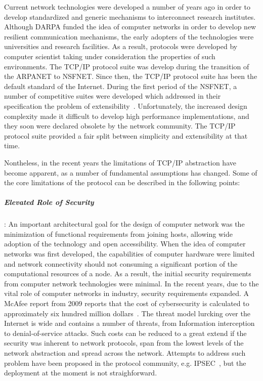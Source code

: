 Current network technologies were developed a number of years ago in order to
develop standardized and generic mechanisms to interconnect
research institutes. Although DARPA funded the idea of computer networks in
order to develop new resilient communication mechanisms, the early adopters of
the technologies were universities and research facilities. As a result,
protocols were developed by computer scientist taking under consideration the
properties of such environments. The TCP/IP protocol suite was develop during
the transition of the ARPANET to NSFNET. Since then, the TCP/IP protocol suite
has been the default standard of the Internet.  During the first period of the
NSFNET, a number of competitive suites were developed which addressed in their
specification the problem of extensibility~.  Unfortunately, the increased design complexity made it
difficult to develop high performance implementations, and they soon
were declared obsolete by the network community. The TCP/IP protocol suite provided a fair
split between simplicity and extensibility at that time.

Nontheless, in the recent years the limitations of TCP/IP abstraction have
become apparent, as a number of fundamental assumptions has changed. Some of the
core limitations of the protocol can be described in the following points:

\subparagraph*{Elevated Role of Security}: 
An important architectural goal for the design of computer network was the
minimization of functional requirements from joining hosts, allowing wide
adoption of the technology and open accessibility.  When the idea of computer
networks was first developed, the capabilities of computer hardware were limited
and network connectivity should not consuming a significant portion of the
computational resources of a node. As a result, the initial security
requirements from computer network technologies were minimal. In the recent
years, due to the vital role of computer networks in industry, security
requirements expanded. A McAfee report from 2009 reports that the cost of
cybersecurity is calculated to approximately six hundred million
dollars~\cite{Acherman:2009wf}. The threat model lurcking over the Internet is
wide and contains a number of threats, from Information interception to
denial-of-service attacks. Such costs can be reduced to a great extend if the security
was inherent to network protocols, span from the lowest levels of the
network abstraction and spread across the network. Attempts to address such
problem have been proposed in the protocol community, e.g. IPSEC~\cite{RFC2401},
but the deployment at the moment is not straighforward.

